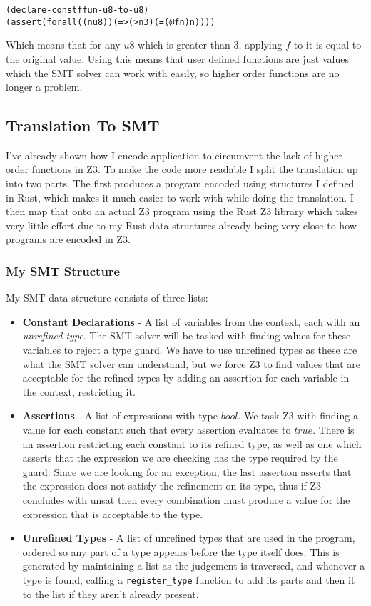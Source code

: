 \begin{alltt}
    (declare-const f fun-u8-to-u8)
    (assert (forall ((n u8)) (=> (> n 3) (= (@ f n) n))))
\end{alltt}

Which means that for any $u8$ which is greater than 3, applying $f$ to it is equal to the original value.
Using this means that user defined functions are just values which the SMT solver can work with
easily, so higher order functions are no longer a problem.

\subsection{Translation To SMT}

I've already shown how I encode application to circumvent the lack of higher order functions in Z3.
To make the code more readable I split the translation up into two parts.
The first produces a program encoded using structures I defined in Rust, which makes it much easier
to work with while doing the translation.
I then map that onto an actual Z3 program using the Rust Z3 library which takes very little effort
due to my Rust data structures already being very close to how programs are encoded in Z3.

\subsubsection{My SMT Structure}

My SMT data structure consists of three lists:

\begin{itemize}
    \item \textbf{Constant Declarations} -
    A list of variables from the context, each with an \textit{unrefined type}.
    The SMT solver will be tasked with finding values for these variables to reject a type guard.
    We have to use unrefined types as these are what the SMT solver can understand, but we force
    Z3 to find values that are acceptable for the refined types by adding an assertion for each
    variable in the context, restricting it.
    \item \textbf{Assertions} -
    A list of expressions with type $bool$.
    We task Z3 with finding a value for each constant such that every assertion evaluates to $true$.
    There is an assertion restricting each constant to its refined type, as well as one which asserts
    that the expression we are checking has the type required by the guard.
    Since we are looking for an exception, the last assertion asserts that the expression does not
    satisfy the refinement on its type, thus if Z3 concludes with unsat then every combination must
    produce a value for the expression that is acceptable to the type.
    \item \textbf{Unrefined Types} -
    A list of unrefined types that are used in the program, ordered so any part of a type appears
    before the type itself does.
    This is generated by maintaining a list as the judgement is traversed, and whenever a type is
    found, calling a \texttt{register\_type} function to add its parts and then it to the list if
    they aren't already present.
\end{itemize}

